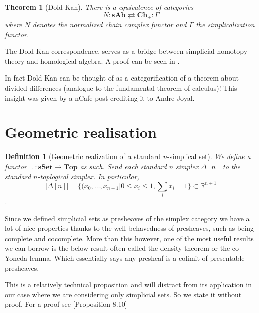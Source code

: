 \documentclass[12pt]{report}
\numberwithin{equation}{section}
\newcommand{\R}{\mathbb{R}}
\newtheorem{theorem}[dummy]{Theorem}
\newtheorem{definition}[dummy]{Definition}
\begin{document}
	
	
	
	\begin{theorem}[Dold-Kan]
		There is a equivalence of categories $$N:\mathbf{sAb}\rightleftarrows \mathbf{Ch}_+: \Gamma$$ where $N$ denotes the normalized chain complex functor and $\Gamma$ the simplicalization functor.
	\end{theorem}
	
	The Dold-Kan correspondence, serves as a bridge between simplicial homotopy theory and homological algebra. A proof can be seen in \cite{Goerss_Jardine_2009}.	
	
	In fact Dold-Kan can be thought of as a categorification of a theorem about divided differences (analogue to the fundamental theorem of calculus)! This insight was given by a nCafe post \cite{ncafedk} crediting it to Andre Joyal.
	
	\section{Geometric realisation}
	

	\begin{definition}[Geometric realization of a standard $n$-simplical set]
		We define a functor $|.|:\mathbf{sSet} \to \mathbf{Top}$ as such. Send each standard $n$ simplex $\Delta[n]$ to the standard $n$-toplogical simplex. In particular,
		\[ |\Delta[n]|=\{ (x_0,\dots,x_{n+1} | 0 \leq x_i \leq 1, \sum_i x_i=1 \} \subset \R^{n+1} \].
	\end{definition}
	
		Since we defined simplicial sets as presheaves of the simplex category we have a lot of nice properties thanks to the well behavedness of presheaves, such as being complete and cocomplete. More than this however, one of the most useful results we can borrow is the below result often called the density theorem or the co-Yoneda lemma. Which essentially says any presheaf is a colimit of presentable presheaves.
	
	This is a relatively technical proposition and will distract from its application in our case where we are considering only simplicial sets. So we state it without proof. For a proof see \cite{Awodey}[Proposition 8.10]	
	
\end{document}
